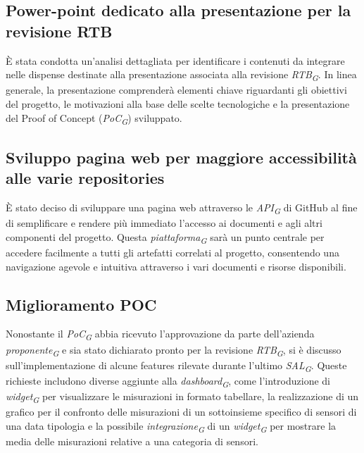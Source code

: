 \documentclass{article}
\begin{document}
    \subsection{Power-point dedicato alla presentazione per la revisione RTB}
    È stata condotta un'analisi dettagliata per identificare i contenuti da integrare nelle dispense destinate alla presentazione associata alla revisione \textit{RTB}\textsubscript{\textit{G}}. In linea generale, la presentazione comprenderà elementi chiave riguardanti gli obiettivi del progetto, le motivazioni alla base delle scelte tecnologiche e la presentazione del Proof of Concept (\textit{PoC}\textsubscript{\textit{G}}) sviluppato.

    \subsection{Sviluppo pagina web per maggiore accessibilità alle varie repositories}
    È stato deciso di sviluppare una pagina web attraverso le \textit{API}\textsubscript{\textit{G}} di GitHub al fine di semplificare e rendere più immediato l'accesso ai documenti e agli altri componenti del progetto. Questa \textit{piattaforma}\textsubscript{\textit{G}} sarà un punto centrale per accedere facilmente a tutti gli artefatti correlati al progetto, consentendo una navigazione agevole e intuitiva attraverso i vari documenti e risorse disponibili.

    \subsection{Miglioramento POC}
    Nonostante il \textit{PoC}\textsubscript{\textit{G}} abbia ricevuto l'approvazione da parte dell’azienda \textit{proponente}\textsubscript{\textit{G}} e sia stato dichiarato pronto per la revisione \textit{RTB}\textsubscript{\textit{G}}, si è discusso sull'implementazione di alcune features rilevate durante l'ultimo \textit{SAL}\textsubscript{\textit{G}}. Queste richieste includono diverse aggiunte alla \textit{dashboard}\textsubscript{\textit{G}}, come l'introduzione di \textit{widget}\textsubscript{\textit{G}} per visualizzare le misurazioni in formato tabellare, la realizzazione di un grafico per il confronto delle misurazioni di un sottoinsieme specifico di sensori di una data tipologia e la possibile \textit{integrazione}\textsubscript{\textit{G}} di un \textit{widget}\textsubscript{\textit{G}} per mostrare la media delle misurazioni relative a una categoria di sensori.
\end{document}
